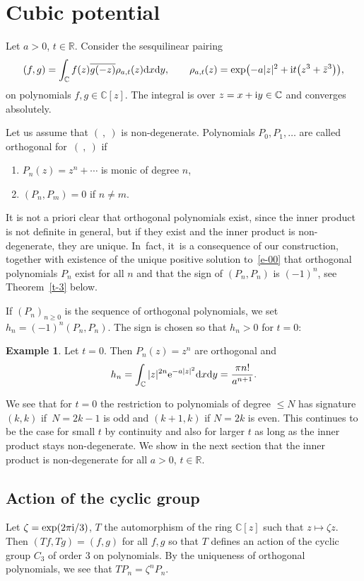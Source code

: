 \documentclass[10pt,a4paper]{amsart}
\numberwithin{equation}{section}
\theoremstyle{definition}
\newtheorem{Example}[Theorem]{Example}
\begin{document}
\section{Cubic potential}\label{s-2}
Let $a>0$, $t\in\mathbb R$. Consider the sesquilinear pairing
\begin{equation}\label{e-1}
(f,g)=\int_{\mathbb C}f(z)\overline{g(-z)}\rho_{a,t}(z){\rm d}x{\rm d}y,\qquad
\rho_{a,t}(z)=\exp\bigl(-a|z|^2+{\rm i}t\bigl(z^3+\bar z^3\bigr)\bigr),
\end{equation}
on polynomials $f,g\in\mathbb C[z]$. The integral is over $z=x+{\rm i}y\in\mathbb C$ and converges absolutely.

Let us assume that $(\ ,\ )$ is non-degenerate.
Polynomials $P_0,P_1,\dots$ are called orthogonal for~$(\ ,\ )$ if
\begin{enumerate}\itemsep=0pt
 \item[(1)] $P_n(z)=z^n+\cdots$ is monic of degree $n$,
 \item[(2)]$(P_n,P_m)=0$ if $n\neq m$.
\end{enumerate}
It is not a priori clear that orthogonal polynomials exist, since the inner product is not definite in general, but if they exist and the inner product is non-degenerate, they are unique. In~fact, it~is a consequence of our construction, together with existence of the unique positive solution to~\eqref{e-00} that orthogonal polynomials $P_n$ exist for all $n$ and that the sign of $(P_n,P_n)$ is $(-1)^n$, see Theorem~\ref{t-3} below.

If $(P_n)_{n\geq0}$ is the sequence of orthogonal polynomials, we set
$
h_n=(-1)^n(P_n,P_n)$.
The sign is chosen so that $h_n>0$ for $t=0$:
\begin{Example}
 Let $t=0$. Then $P_n(z)=z^n$ are orthogonal and
 \[
 h_n=\int_{\mathbb C} |z|^{2n}{\rm e}^{-a|z|^2}{\rm d}x{\rm d}y=\frac{\pi n!}{a^{n+1}}.
 \]
\end{Example}
We see that for $t=0$ the restriction to polynomials of degree $\leq N$ has signature $(k,k)$ if~${N=2k-1}$ is odd and $(k+1,k)$ if $N=2k$ is even. This continues to be the case for small $t$ by continuity and also for larger $t$ as long as the inner product stays non-degenerate. We show in the next section that the inner product is non-degenerate for all $a>0$, $t\in\mathbb R$.

\subsection{Action of the cyclic group}
Let $\zeta=\exp(2\pi {\rm i}/3)$, $T$ the automorphism of the ring $\mathbb C[z]$ such that $z\mapsto \zeta z$. Then $(Tf,Tg)=(f,g)$ for all $f,g$ so that $T$ defines an action of the cyclic group $C_3$ of order 3 on polynomials. By the uniqueness of orthogonal polynomials, we see that
$TP_n=\zeta^nP_n$.
\end{document}
